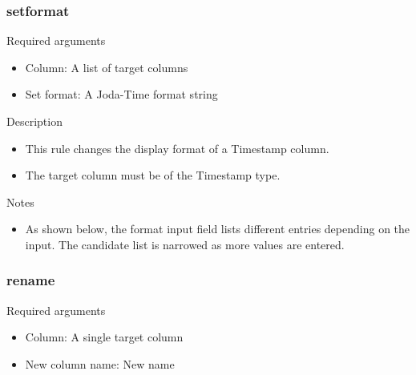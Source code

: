 \documentclass[letterpaper,10pt,english]{sphinxmanual}
\begin{document}
\subsubsection{setformat}
\label{\detokenize{discovery/part07/rule_kinds:setformat}}
Required arguments
\begin{itemize}
\item {} 
Column: A list of target columns

\item {} 
Set format: A Joda-Time format string

\end{itemize}

Description
\begin{itemize}
\item {} 
This rule changes the display format of a Timestamp column.

\item {} 
The target column must be of the Timestamp type.

\end{itemize}

Notes
\begin{itemize}
\item {} 
As shown below, the format input field lists different entries depending on the input. The candidate list is narrowed as more values are entered.
\begin{quote}

\begin{figure}[H]
\centering

\noindent{}
\end{figure}
\end{quote}

\end{itemize}


\subsubsection{rename}
\label{\detokenize{discovery/part07/rule_kinds:rename}}
Required arguments
\begin{itemize}
\item {} 
Column: A single target column

\item {} 
New column name: New name

\end{itemize}
\end{document}
